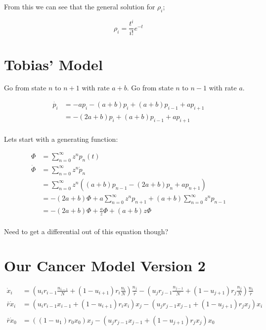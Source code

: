 \documentclass[a4paper]{article}
\begin{document}
From this we can see that the general solution for $\rho _i$; 

\begin{equation}
\rho _i = \frac{t ^i}{i!} e ^{-t} 
\end{equation}

\section{Tobias' Model}

Go from state $n$ to $n+1$ with rate $a+b$. 
Go from state $n$ to $n-1$ with rate $a$. 

\begin{align*}
\dot{p_i} & = -a p_i - (a+b ) p_i + (a+b) p_{i-1} + a p_{i+1} \\
& = - (2a + b) p_i +(a+b) p_{i-1} + a p_{i+1} \\
\end{align*}

Lets start with a generating function: 

\begin{align*}
\Phi & = \sum _{n = 0} ^\infty z^n p_n (t) \\
\dot{\Phi} & = \sum _{n=0} ^\infty z^n \dot{p} _n \\
& = \sum _{n = 0} ^\infty z^n \left( (a+b) p_{n-1} - (2a+b) p_n + a p_{n+1} \right) \\
& = - (2a+b) \Phi + a \sum _{n=0} ^\infty z ^n p_{n+1} + (a+b) \sum _{n=0} ^\infty z ^n p_{n-1} \\
& = - (2a + b) \Phi + \frac{a}{z} \Phi + (a+b) z \Phi \\
\end{align*}

Need to get a differential out of this equation though? 

\section{Our Cancer Model Version 2}

\begin{align*}
\dot{x}_i & = \left(u_i r_{i-1} \frac{n_{i-1}}{N} + \left(1 - u_{i+1} \right) r_i \frac{n_i}{N} \right) \frac{n_j}{\bar{r}} - \left(u_j r_{j-1} \frac{n_{j-1}}{N} + \left(1 - u_{j+1} \right) r_j \frac{n_j}{N} \right) \frac{n_i}{\bar{r}} \\
\bar{r} \dot{x}_i & = \left(u_i r_{i-1} x_{i-1} + \left(1 - u_{i+1} \right) r_i x_i \right) x_j - \left(u_j r_{j-1} x_{j-1} + \left(1 - u_{j+1} \right) r_j x_j \right) x_i \\
\\
\bar{r} \dot{x}_0 & = \left( \left(1 - u_{1} \right) r_0 x_0 \right) x_j - \left(u_j r_{j-1} x_{j-1} + \left(1 - u_{j+1} \right) r_j x_j \right) x_0 \\
\\
\end{align*}
\end{document}
